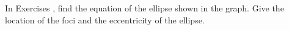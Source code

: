 {\noindent In Exercises}
{, find the equation of the ellipse shown in the graph. Give the location of the foci and the eccentricity of the ellipse.
}
